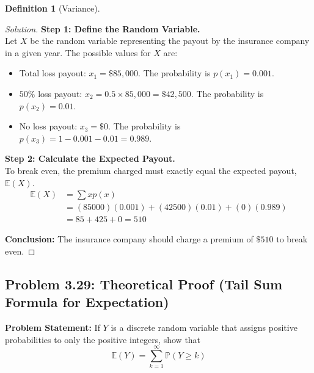 \documentclass[11pt,letterpaper]{article}
\theoremstyle{definition}
\newtheorem{definition}{Definition}[section]
\theoremstyle{plain}
\theoremstyle{remark}
\newcommand{\E}{\mathbb{E}}
\newcommand{\Prob}{\mathbb{P}}
\begin{document}
\begin{definition}[Variance]
\begin{proof}[Solution]
\textbf{Step 1: Define the Random Variable.}\\
Let $X$ be the random variable representing the payout by the insurance company in a given year.
The possible values for $X$ are:
\begin{itemize}
    \item Total loss payout: $x_1 = \$85,000$. The probability is $p(x_1) = 0.001$.
    \item $50\%$ loss payout: $x_2 = 0.5 \times 85,000 = \$42,500$. The probability is $p(x_2) = 0.01$.
    \item No loss payout: $x_3 = \$0$. The probability is $p(x_3) = 1 - 0.001 - 0.01 = 0.989$.
\end{itemize}

\textbf{Step 2: Calculate the Expected Payout.}\\
To break even, the premium charged must exactly equal the expected payout, $\E(X)$.
\begin{align*}
\E(X) &= \sum x p(x) \\
&= (85000)(0.001) + (42500)(0.01) + (0)(0.989) \\
&= 85 + 425 + 0 = 510
\end{align*}

\textbf{Conclusion:} The insurance company should charge a premium of $\$510$ to break even.
\end{proof}

\subsection{Problem 3.29: Theoretical Proof (Tail Sum Formula for Expectation)}
\textbf{Problem Statement:} If $Y$ is a discrete random variable that assigns positive probabilities to only the positive integers, show that
\[ \E(Y) = \sum_{k=1}^\infty \Prob(Y \ge k) \]


\end{definition}
\end{document}
